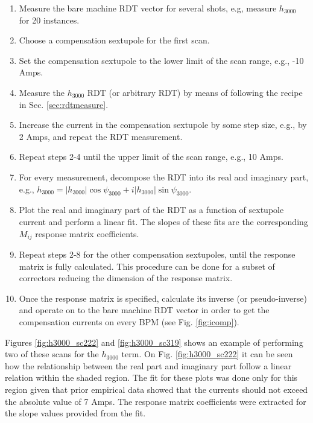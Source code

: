 \begin{enumerate}
    \item Measure the bare machine RDT vector for several shots, e.g, measure $h_{3000}$ for 20 instances.
    \item Choose a compensation sextupole for the first scan.
    \item Set the compensation sextupole to the lower limit of the scan range, e.g., -10 Amps.
    \item Measure the $h_{3000}$ RDT (or arbitrary RDT) by means of following the recipe in Sec. \ref{sec:rdtmeasure}.
    \item Increase the current in the compensation sextupole by some step size, e.g., by 2 Amps, and repeat the RDT measurement.
    \item Repeat steps 2-4 until the upper limit of the scan range, e.g., 10 Amps.
    \item For every measurement, decompose the RDT into its real and imaginary part, e.g., $h_{3000}= |h_{3000}| \cos \psi_{3000} + i |h_{3000}| \sin \psi_{3000}$. 
    \item Plot the real and imaginary part of the RDT as a function of sextupole current and perform a linear fit. The slopes of these fits are the corresponding $M_{ij}$ response matrix coefficients.
    \item Repeat steps 2-8 for the other compensation sextupoles, until the response matrix is fully calculated. This procedure can be done for a subset of correctors reducing the dimension of the response matrix. 
    \item Once the response matrix is specified, calculate its inverse (or pseudo-inverse) and operate on to the bare machine RDT vector in order to get the compensation currents on every BPM (see Fig. \ref{fig:icomp}).
\end{enumerate}

Figures \ref{fig:h3000_sc222} and \ref{fig:h3000_sc319} shows an example of performing two of these scans for the $h_{3000}$ term. On Fig. \ref{fig:h3000_sc222} it can be seen how the relationship between the real part and imaginary part follow a linear relation within the shaded region. The fit for these plots was done only for this region given that prior empirical data showed that the currents should not exceed the absolute value of 7 Amps. The response matrix coefficients were extracted for the slope values provided from the fit.  

